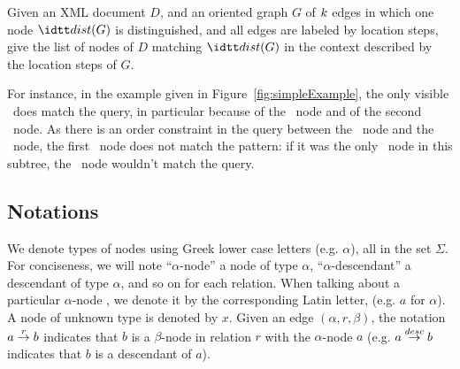\begin{definition}
  Given an XML document $D$, and an oriented graph $G$ of $k$
  edges in which one node $\dist(G)$ is distinguished, and all edges
  are labeled by location steps, give the list of nodes of $D$
  matching $\dist(G)$ in the context described by the location steps
  of $G$.
\end{definition}

\begin{EXAMPLE}
For instance, in the example given in Figure~\ref{fig:simpleExample},
the only visible \patient\ does match the query, in particular because
of the \prescription\ node and of the second \test\ node.
%
As there is an order constraint in the query between the
\prescription\ node and the \test\ node, the first \test\ node does
not match the pattern: if it was the only \test\ node in this subtree,
the \patient\ node wouldn't match the query.
\end{EXAMPLE}

\subsection{Notations}

We denote types of nodes using Greek lower case letters
(e.g. $\alpha$), all in the set $\Sigma$.
%
For conciseness, we will note ``$\alpha$-node'' a node of type
$\alpha$, ``$\alpha$-descendant'' a descendant of type $\alpha$, and
so on for each relation.
%
When talking about a particular $\alpha$-node , we denote it by the
corresponding Latin letter, (e.g. $a$ for $\alpha$). A node of unknown
type is denoted by $x$.
%
Given an edge $(\alpha,r,\beta)$, the notation ${a \stackrel{r}{\rightarrow} b}$
indicates that $b$ is a $\beta$-node in relation $r$ with the
$\alpha$-node $a$ (e.g. ${a \stackrel{desc}{\rightarrow} b}$ indicates that $b$ is a
descendant of $a$).

